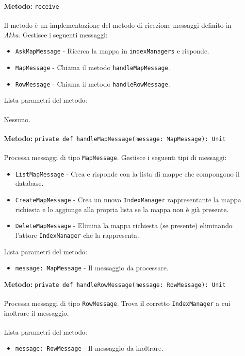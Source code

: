 \documentclass[a4paper]{article}
\begin{document}
		\textbf{Metodo: }\texttt{receive}
			\\ \\
			Il metodo è un implementazione del metodo di ricezione messaggi definito in \emph{Akka}. Gestisce i seguenti messaggi:
			\begin{itemize}
				\item \texttt{AskMapMessage} - Ricerca la mappa in \texttt{indexManagers} e risponde.
				\item \texttt{MapMessage} - Chiama il metodo \texttt{handleMapMessage}.
				\item \texttt{RowMessage} - Chiama il metodo \texttt{handleRowMessage}.
			\end{itemize}
			Lista parametri del metodo:
			\\ \\
			Nessuno.
			\\ \\
		\textbf{Metodo: }\texttt{private def handleMapMessage(message: MapMessage): Unit}
			\\ \\
			Processa messaggi di tipo \texttt{MapMessage}. Gestisce i seguenti tipi di messaggi:
			\begin{itemize}
				\item \texttt{ListMapMessage} - Crea e risponde con la lista di mappe che compongono il database.
				\item \texttt{CreateMapMessage} - Crea un nuovo \texttt{IndexManager} rappresentante la mappa richiesta e lo aggiunge alla propria lista se la mappa non è già presente.
				\item \texttt{DeleteMapMessage} - Elimina la mappa richiesta (se presente) eliminando l'attore \texttt{IndexManager} che la rappresenta.
			\end{itemize}
			Lista parametri del metodo:
			\begin{itemize}
				\item \texttt{message: MapMessage} - Il messaggio da processare.
			\end{itemize}
		\textbf{Metodo: }\texttt{private def handleRowMessage(message: RowMessage): Unit}
			\\ \\
			Processa messaggi di tipo \texttt{RowMessage}. Trova il corretto \texttt{IndexManager} a cui inoltrare il messaggio.
			\\ \\
			Lista parametri del metodo:
			\begin{itemize}
				\item \texttt{message: RowMessage} - Il messaggio da inoltrare.
			\end{itemize}
			
\end{document}
